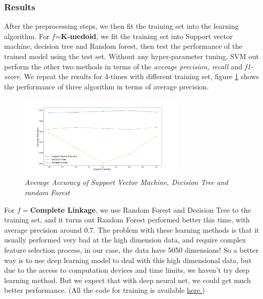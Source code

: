 \documentclass{uonmathreport}
\begin{document}
\subsubsection{Results} 
After the preprocessing steps, we then fit the training set into the learning algorithm. For $f$=\textbf{K-medoid}, we fit the training set into Support vector machine, decision tree and Random forest, then test the performance of the trained model using the test set. Without any hyper-parameter tuning, SVM out perform the other two methods in terms of the \textit{average precision, recall} and \textit{f1-score}. We repeat the results for 4-times with different training set, figure \ref{fig:machine-learning} shows the performance of three algorithm in terms of average precision.

\begin{figure}[H]
 \begin{center}
   \includegraphics[width=0.7\textwidth]{posterDiscussion.png}
 \end{center}
 \caption{\textit{Average Accuracy of Support Vector Machine, Decision Tree and random Forest}}
 \label{fig:machine-learning}
\end{figure}

For $f=$\textbf{Complete Linkage}, we use Random Forest and Decision Tree to the training set, and it turns out Random Forest performed better this time, with average precision around $0.7$. The problem with these learning methods is that it usually performed very bad at the high dimension data, and require complex feature selection process, in our case, the data have 5050 dimensions! So a better way is to use deep learning model to deal with this high dimensional data, but due to the access to computation devices and time limits, we haven't try deep learning method. But we expect that with deep neural net, we could get much better performance. (All the code for training is available \href{https://github.com/Zehui127/clusteringResearch2019}{here.})
\end{document}
